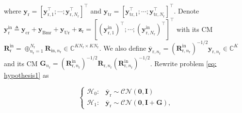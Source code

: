 \documentclass[10pt,journal]{IEEEtran}
\newcommand{\paren}[1]{\left({#1}\right)}
\newcommand{\bracket}[1]{{\left [{#1}\right ]}}
\newcommand{\rr}{_\mathrm{r}}
\newcommand{\sfrac}[2]{#1/#2}
\theoremstyle{definition}
\begin{document}
		where $\mathbf{y}_{\mathrm{r}}=\bracket{\mathbf{y}^\top_{\textrm{r},1};\cdots;\mathbf{y}^\top_{\textrm{r},\mathit{N}\rr}}^\top$ and $\mathbf{y}_{\textrm{tr}}=\bracket{\mathbf{y}^\top_{\textrm{tr},1};\cdots;\mathbf{y}^\top_{\textrm{tr},\mathit{N}\rr}}^\top$. Denote $\mathbf{y}^{\textrm{in}}_{\textrm{r}}\triangleq\mathbf{y}_{\textrm{cr}}+\mathbf{y}_{\textrm{Bmr}}+\mathbf{y}_{\textrm{Ur}}+\mathbf{z}_{\textrm{r}}=\bracket{\paren{\mathbf{y}^{\textrm{in}}_{\textrm{r},1}}^\top;\cdots;\paren{\mathbf{y}^{\textrm{in}}_{\textrm{r},N\rr}}^\top}^\top$ with its CM $\mathbf{R}^{\textrm{in}}_{\textrm{r}}=\oplus_{n\rr=1}^{N\rr}\mathbf{R}_{\textrm{in},n\rr}\in\mathbb{C}^{KN\rr\times KN\rr}$. We also define $\overline{\mathbf{y}}_{\textrm{r},n\rr} = \paren{\mathbf{R}^{\textrm{in}}_{\textrm{r},n\rr}}^{-\sfrac{1}{2}}\mathbf{y}_{\textrm{r},n\rr}\in\mathbb{C}^{K}$ and its CM $\mathbf{G}_{n\rr}=\paren{\mathbf{R}^{\textrm{in}}_{\textrm{r},n\rr}}^{-\sfrac{1}{2}}\mathbf{R}_{\textrm{r},n\rr}\paren{\mathbf{R}^{\textrm{in}}_{\textrm{r},n\rr}}^{-\sfrac{1}{2}}$. Rewrite problem \eqref{eq: hypothesis1} as  \par\noindent\small
		\begin{equation}
			\label{eq: hypothesis2}
			\begin{cases}
				\mathcal{H}_{\mathrm{0}}: & \overline{\mathbf{y}}_{\mathrm{r}}\sim\mathcal{CN}\paren{\mathbf{0},\mathbf{I}}
				\\
				\mathcal{H}_{\mathrm{1}}: & \overline{\mathbf{y}}_{\mathrm{r}}\sim\mathcal{CN}\paren{\mathbf{0},\mathbf{I}+\mathbf{G}},
			\end{cases}
		\end{equation}\normalsize
\end{document}

